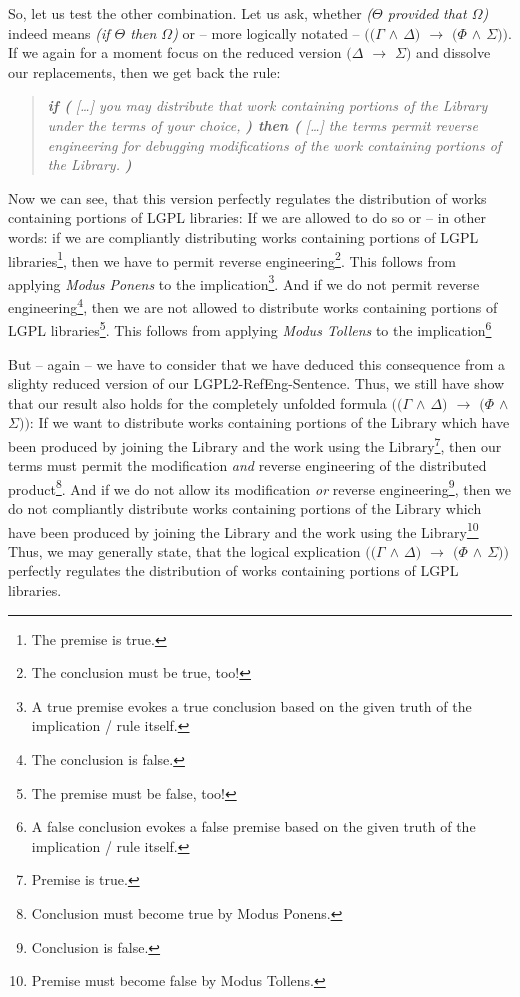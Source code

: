 So, let us test the other combination. Let us ask, whether \emph{($\Theta$
provided that $\Omega$)} indeed means \emph{(if $\Theta$ then $\Omega$)} or --
more logically notated -- \emph{$((\Gamma$ $\wedge$ $\Delta)$ $\rightarrow$ $(\Phi$
$\wedge$ $\Sigma))$}. If we again for a moment focus on the reduced version
\emph{$(\Delta$ $\rightarrow$ $\Sigma)$} and dissolve our replacements, then we
get back the rule:

\begin{quote}\noindent\emph{\textbf{if (} [\ldots] you may distribute that work
containing portions of the Library under the terms of your choice, \textbf{)
then (} [\ldots] the terms permit reverse engineering for debugging
modifications of the work containing portions of the Library.
\textbf{)}}\end{quote}

Now we can see, that this version perfectly regulates the distribution of works
containing portions of LGPL libraries: If we are allowed to do so or -- in other
words: if we are compliantly distributing works containing portions of LGPL
libraries\footnote{The premise is true.}, then we have to permit reverse
engineering\footnote{The conclusion must be true, too!}. This follows from
applying \emph{Modus Ponens} to the implication\footnote{A true premise evokes a
true conclusion based on the given truth of the implication / rule itself.}. And
if we do not permit reverse engineering\footnote{The conclusion is false.}, then
we are not allowed to distribute works containing portions of LGPL
libraries\footnote{The premise must be false, too!}. This follows from applying
\emph{Modus Tollens} to the implication\footnote{A false conclusion evokes a
false premise based on the given truth of the implication / rule itself.}

But -- again -- we have to consider that we have deduced this consequence from a
slighty reduced version of our LGPL2-RefEng-Sentence. Thus, we still have show
that our result also holds for the completely unfolded formula \emph{$((\Gamma$
$\wedge$ $\Delta)$ $\rightarrow$ $(\Phi$ $\wedge$ $\Sigma))$}: If we want to
distribute works containing portions of the Library which have been produced by
joining the Library and the work using the Library\footnote{Premise is true.},
then our terms must permit the modification \emph{and} reverse engineering of
the distributed product\footnote{Conclusion must become true by Modus Ponens.}.
And if we do not allow its modification \emph{or} reverse
engineering\footnote{Conclusion is false.}, then we do not compliantly
distribute works containing portions of the Library which have been produced by
joining the Library and the work using the Library\footnote{Premise must become
false by Modus Tollens.} Thus, we may generally state, that the logical
explication \emph{$((\Gamma$ $\wedge$ $\Delta)$ $\rightarrow$ $(\Phi$ $\wedge$
$\Sigma))$} perfectly regulates the distribution of works containing portions of
LGPL libraries.


